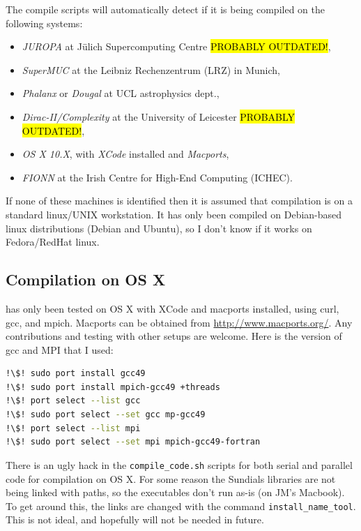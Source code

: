 \documentclass[a4paper,11pt]{report}
\begin{document}
The compile scripts will automatically detect if it is being compiled on the following systems:
\begin{itemize}
\item \emph{JUROPA} at J\"ulich Supercomputing Centre \hl{PROBABLY OUTDATED!},
\item \emph{SuperMUC} at the Leibniz Rechenzentrum (LRZ) in Munich,
\item \emph{Phalanx} or \emph{Dougal} at UCL astrophysics dept.,
\item \emph{Dirac-II/Complexity} at the University of Leicester \hl{PROBABLY OUTDATED!},
\item \emph{OS X 10.X}, with \emph{XCode} installed and \emph{Macports},
\item \emph{FIONN} at the Irish Centre for High-End Computing (ICHEC).
\end{itemize}
If none of these machines is identified then it is assumed that compilation is on a standard linux/UNIX workstation.
It has only been compiled on Debian-based linux distributions (Debian and Ubuntu), so I don't know if it works on Fedora/RedHat linux.

\subsection{Compilation on OS X}
\pion{} has only been tested on OS X with XCode and macports installed, using curl, gcc, and mpich.
Macports can be obtained from \href{http://www.macports.org/}{http://www.macports.org/}.
Any contributions and testing with other setups are welcome.
Here is the version of gcc and MPI that I used:

\begin{lstlisting}[language=bash, escapechar=!]
!\$! sudo port install gcc49
!\$! sudo port install mpich-gcc49 +threads
!\$! port select --list gcc
!\$! sudo port select --set gcc mp-gcc49
!\$! port select --list mpi
!\$! sudo port select --set mpi mpich-gcc49-fortran
\end{lstlisting}

There is an ugly hack in the \lstinline|compile_code.sh| scripts for both serial and parallel code for compilation on OS X.
For some reason the Sundials libraries are not being linked with paths, so the executables don't run as-is (on JM's Macbook).
To get around this, the links are changed with the command \lstinline|install_name_tool|.
This is not ideal, and hopefully will not be needed in future.
\end{document}
